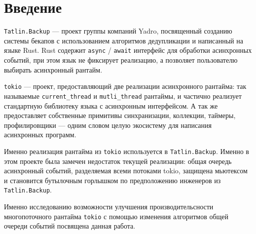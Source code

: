 
\section*{Введение}
\thispagestyle{withCompileDate}

\verb|Tatlin.Backup| --- проект группы компаний Yadro, посвященный созданию системы бекапов с использованием алгоритмов дедупликации и написанный на языке Rust.
Rust содержит \verb|async| / \verb|await| интерфейс для обработки асинхронных событий, при этом язык не фиксирует реализацию, а позволяет пользователю выбирать асинхронный рантайм.

\verb|tokio| --- проект, предоставляющий две реализации асинхронного рантайма: так называемые \verb|current_thread| и \verb|mutli_thread| рантаймы, и частично реализует стандартную библиотеку языка с асинхронным интерфейсом. А так же предоставляет собственные примитивы синхранизации, коллекции, таймеры, профилировщики --- одним словом целую экосистему для написания асинхронных программ.

Именно реализация рантайма из \verb|tokio| используется в \verb|Tatlin.Backup|. Именно в этом проекте была замечен недостаток текущей реализации: общая очередь асинхронный событий, разделяемая всеми потоками tokio, защищена мьютексом и становится бутылочным горлышком по предположению инженеров из \verb|Tatlin.Backup|.

Именно исследованию возможности улучшения производительсности многопоточного рантайма \verb|tokio| с помощью изменения алгоритмов общей очереди событий посвящена данная работа.
